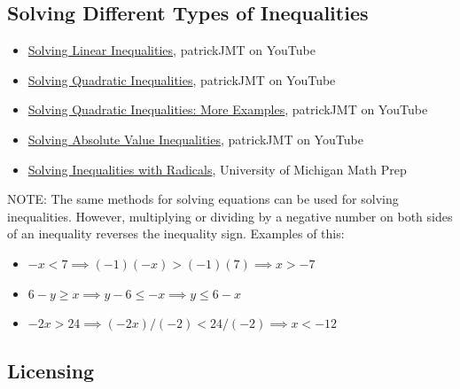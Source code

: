\subsection{Solving Different Types of Inequalities}
\label{sss:solv-a472}




\begin{itemize}
    \item \href{https://www.youtube.com/watch?v=eNxruTEpY4o}{Solving Linear Inequalities}, patrickJMT on YouTube
    \item \href{https://www.youtube.com/watch?v=t54ccHYVhoo}{Solving Quadratic Inequalities}, patrickJMT on YouTube
    \item \href{https://www.youtube.com/watch?v=WZqZPLaK1cg}{Solving Quadratic Inequalities: More Examples}, patrickJMT on YouTube
    \item \href{https://www.youtube.com/watch?v=OzmqAZZd88g}{Solving Absolute Value Inequalities}, patrickJMT on YouTube
    \item \href{https://prep.math.lsa.umich.edu/cgi-bin/pmc/crtopic?sxn=8\&top=3\&crssxn=prep}{Solving Inequalities with Radicals}, University of Michigan Math Prep
\end{itemize}

NOTE: The same methods for solving equations can be used for solving inequalities.
However, multiplying or dividing by a negative number on both sides of an inequality
reverses the inequality sign. Examples of this:



\begin{itemize}
    \item $-x < 7 \implies (-1)(-x) > (-1)(7) \implies x > -7$
    \item $6 - y \ge x \implies y - 6 \le -x \implies y \le  6 - x$
    \item $-2x > 24 \implies (-2x)/(-2) < 24/(-2) \implies x < -12$
\end{itemize}


\subsection{Licensing}
\label{sss:lice-73526}




